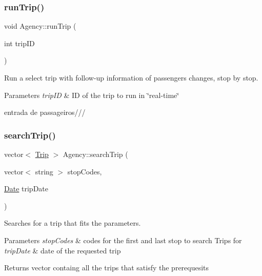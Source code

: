 \subsubsection{\texorpdfstring{run\+Trip()}{runTrip()}}
{\footnotesize\ttfamily void Agency\+::run\+Trip (\begin{DoxyParamCaption}\item[{int}]{trip\+ID }\end{DoxyParamCaption})}



Run a select trip with follow-\/up information of passengers changes, stop by stop. 


\begin{DoxyParams}{Parameters}
{\em trip\+ID} & ID of the trip to run in \char`\"{}real-\/time\char`\"{} \\
\hline
\end{DoxyParams}
entrada de passageiros/// \mbox{\label{class_agency_a7ec6b058801f49850148979c1a41554a}} 
\subsubsection{\texorpdfstring{search\+Trip()}{searchTrip()}}
{\footnotesize\ttfamily vector$<$ \hyperlink{class_trip}{Trip} $>$ Agency\+::search\+Trip (\begin{DoxyParamCaption}\item[{vector$<$ string $>$}]{stop\+Codes,  }\item[{\hyperlink{class_date}{Date}}]{trip\+Date }\end{DoxyParamCaption})}



Searches for a trip that fits the parameters. 


\begin{DoxyParams}{Parameters}
{\em stop\+Codes} & codes for the first and last stop to search Trips for \\
\hline
{\em trip\+Date} & date of the requested trip\\
\hline
\end{DoxyParams}
\begin{DoxyReturn}{Returns}
vector containg all the trips that satisfy the prerequesits 
\end{DoxyReturn}
\mbox{\label{class_agency_a1f58c5179d80187fc0b53a6da93dee90}} 
